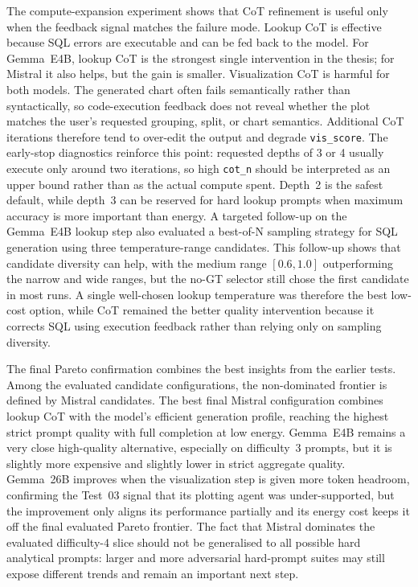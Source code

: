 The compute-expansion experiment shows that CoT refinement is useful only
when the feedback signal matches the failure mode. Lookup CoT is effective
because SQL errors are executable and can be fed back to the model. For
Gemma~E4B, lookup CoT is the strongest single intervention in the thesis;
for Mistral it also helps, but the gain is smaller. Visualization CoT is
harmful for both models. The generated chart often fails semantically rather
than syntactically, so code-execution feedback does not reveal whether the
plot matches the user's requested grouping, split, or chart semantics.
Additional CoT iterations therefore tend to over-edit the output and degrade
\texttt{vis\_score}. The early-stop diagnostics reinforce this
point: requested depths of 3 or 4 usually execute only around two iterations,
so high \texttt{cot\_n} should be interpreted as an upper bound rather than
as the actual compute spent. Depth~2 is the safest default, while depth~3 can
be reserved for hard lookup prompts when maximum accuracy is more important
than energy. A targeted follow-up on the Gemma~E4B lookup step also evaluated
a best-of-N sampling strategy for SQL generation using three temperature-range
candidates. This follow-up shows that candidate diversity can help, with the
medium range $[0.6,1.0]$ outperforming the narrow and wide ranges, but the
no-GT selector still chose the first candidate in most runs. A single
well-chosen lookup temperature was therefore the best low-cost option, while
CoT remained the better quality intervention because it corrects SQL using
execution feedback rather than relying only on sampling diversity.

The final Pareto confirmation combines the best insights from the earlier
tests. Among the evaluated candidate configurations, the non-dominated frontier
is defined by Mistral candidates. The best final Mistral configuration combines
lookup CoT with the model's efficient generation profile, reaching the highest
strict prompt quality with full completion at low energy. Gemma~E4B remains a
very close high-quality alternative, especially on difficulty~3 prompts, but
it is slightly more expensive and slightly lower in strict aggregate quality.
Gemma~26B improves when the visualization step is
given more token headroom, confirming the Test~03 signal that its plotting
agent was under-supported, but the improvement only aligns its performance
partially and its energy cost keeps it off the final evaluated Pareto frontier.
The fact that Mistral dominates the evaluated difficulty-4 slice should not be
generalised to all possible hard analytical prompts: larger and more adversarial
hard-prompt suites may still expose different trends and remain an important
next step.

